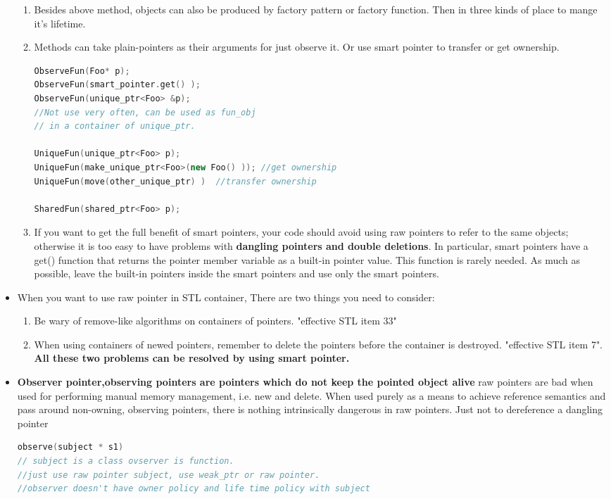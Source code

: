 \documentclass[a4paper,11pt,twoside]{book}
\begin{document}
\begin{itemize}
\begin{enumerate}
\item Besides above method, objects can also be produced by factory pattern or factory function. Then in three kinds of place to mange it's lifetime. 

\item Methods can take plain-pointers as their arguments for just observe it. Or use smart pointer to transfer or get ownership.
\begin{lstlisting}[frame=single, language=c++]
ObserveFun(Foo* p);
ObserveFun(smart_pointer.get() );
ObserveFun(unique_ptr<Foo> &p);
//Not use very often, can be used as fun_obj
// in a container of unique_ptr.

UniqueFun(unique_ptr<Foo> p);
UniqueFun(make_unique_ptr<Foo>(new Foo() )); //get ownership
UniqueFun(move(other_unique_ptr) )  //transfer ownership

SharedFun(shared_ptr<Foo> p);
\end{lstlisting}

\item If you want to get the full benefit of smart pointers, your code should avoid using raw pointers to refer to the same objects; otherwise it is too easy to have problems with \textbf{dangling pointers and double deletions}. In particular, smart pointers have a get() function that returns the pointer member variable as a built-in pointer value. This function is rarely needed. As much as possible, leave the built-in pointers inside the smart pointers and use only the smart pointers.
\end{enumerate}


\item When you want to use raw pointer in STL container, There are two things you need to consider:
\begin{enumerate}
\item  Be wary of remove-like algorithms on containers of pointers. "effective STL item 33"

\item When using containers of newed pointers, remember to delete the pointers before the container is destroyed. "effective STL item 7". \textbf{All these two problems can be resolved by using smart pointer.}
\end{enumerate}

\item \textbf{Observer pointer,observing pointers are pointers which do not keep the pointed object alive} raw pointers are bad when used for performing manual memory management, i.e. new and delete. When used purely as a means to achieve reference semantics and pass around non-owning, observing pointers, there is nothing intrinsically dangerous in raw pointers. Just not to dereference a dangling pointer
\begin{lstlisting}[frame=single, language=c++]
observe(subject * s1)
// subject is a class ovserver is function.
//just use raw pointer subject, use weak_ptr or raw pointer.
//observer doesn't have owner policy and life time policy with subject
\end{lstlisting}

\end{itemize}
\end{document}
